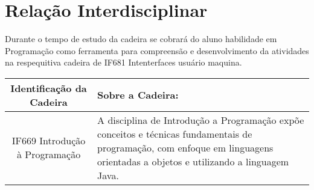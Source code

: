 \documentclass[10pt]{article}
\begin{document}
\section{Relação Interdisciplinar}

Durante o tempo de estudo da cadeira se cobrará do aluno habilidade em Programação como ferramenta para compreensão e desenvolvimento da atividades na respequitiva cadeira de IF681 Intenterfaces usuário maquina.

\begin{center}
\begin{tabular}{|c|p{6cm}|}

\hline
Identificação da Cadeira & Sobre a Cadeira: \\ \hline
 IF669 Introdução à Programação &
 A disciplina de Introdução a Programação expõe conceitos e técnicas fundamentais de programação, com enfoque em linguagens orientadas a objetos e utilizando a linguagem Java.\cite{IF669}
 \\ \hline

\end{tabular}    
\end{center}



\end{document}
